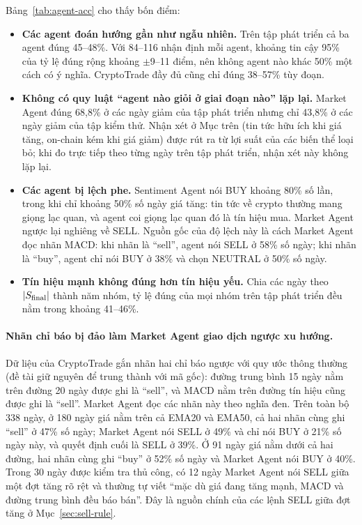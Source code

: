 Bảng~\ref{tab:agent-acc} cho thấy bốn điểm:
\begin{itemize}
  \item \textbf{Các agent đoán hướng gần như ngẫu nhiên.} Trên tập phát triển cả ba agent đúng 45--48\%. Với 84--116 nhận
  định mỗi agent, khoảng tin cậy 95\% của tỷ lệ đúng rộng khoảng $\pm$9--11 điểm, nên không agent nào khác 50\% một cách
  có ý nghĩa. CryptoTrade đầy đủ cũng chỉ đúng 38--57\% tùy đoạn.
  \item \textbf{Không có quy luật ``agent nào giỏi ở giai đoạn nào'' lặp lại.} Market Agent đúng 68,8\% ở các ngày giảm
  của tập phát triển nhưng chỉ 43,8\% ở các ngày giảm của tập kiểm thử. Nhận xét ở Mục trên (tin tức hữu ích khi giá
  tăng, on-chain kém khi giá giảm) được rút ra từ lợi suất của các biến thể loại bỏ; khi đo trực tiếp theo từng ngày
  trên tập phát triển, nhận xét này không lặp lại.
  \item \textbf{Các agent bị lệch phe.} Sentiment Agent nói BUY khoảng 80\% số lần, trong khi chỉ khoảng 50\% số ngày
  giá tăng: tin tức về crypto thường mang giọng lạc quan, và agent coi giọng lạc quan đó là tín hiệu mua. Market Agent
  ngược lại nghiêng về SELL. Nguồn gốc của độ lệch này là cách Market Agent đọc nhãn MACD: khi nhãn là ``sell'',
  agent nói SELL ở 58\% số ngày; khi nhãn là ``buy'', agent chỉ nói BUY ở 38\% và chọn NEUTRAL ở 50\% số ngày.
  \item \textbf{Tín hiệu mạnh không đúng hơn tín hiệu yếu.} Chia các ngày theo $|S_{\text{final}}|$ thành năm nhóm, tỷ lệ đúng
  của mọi nhóm trên tập phát triển đều nằm trong khoảng 41--46\%.
\end{itemize}

\paragraph{Nhãn chỉ báo bị đảo làm Market Agent giao dịch ngược xu hướng.} Dữ liệu của CryptoTrade gắn nhãn hai chỉ báo
ngược với quy ước thông thường (đề tài giữ nguyên để trung thành với mã gốc): đường trung bình 15 ngày nằm trên đường 20
ngày được ghi là ``sell'', và MACD nằm trên đường tín hiệu cũng được ghi là ``sell''. Market Agent đọc các nhãn này theo
nghĩa đen. Trên toàn bộ 338 ngày, ở 180 ngày giá nằm trên cả EMA20 và EMA50, cả hai nhãn cùng ghi ``sell'' ở 47\% số
ngày; Market Agent nói SELL ở 49\% và chỉ nói BUY ở 21\% số ngày này, và quyết định cuối là SELL ở 39\%. Ở 91 ngày giá
nằm dưới cả hai đường, hai nhãn cùng ghi ``buy'' ở 52\% số ngày và Market Agent nói BUY ở 40\%. Trong 30 ngày được kiểm
tra thủ công, có 12 ngày Market Agent nói SELL giữa một đợt tăng rõ rệt và thường tự viết ``mặc dù giá đang tăng mạnh,
MACD và đường trung bình đều báo bán''. Đây là nguồn chính của các lệnh SELL giữa đợt tăng ở Mục~\ref{sec:sell-rule}.


